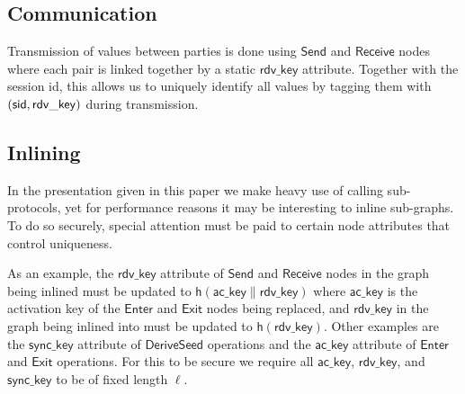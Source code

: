 \subsection{Communication}

Transmission of values between parties is done using $\mathsf{Send}$ and
$\mathsf{Receive}$ nodes where each pair is linked together by a static
$\mathsf{rdv\_key}$ attribute. Together with the session id, this allows us to
uniquely identify all values by tagging them with $(\mathsf{sid}, \mathsf{rdv\_key})$
during transmission.



\subsection{Inlining}

In the presentation given in this paper we make heavy use of calling sub-protocols, yet for performance reasons it may be interesting to inline sub-graphs. To do so securely, special attention must be paid to certain node attributes that control uniqueness.

As an example, the $\mathsf{rdv\_key}$ attribute of $\mathsf{Send}$ and $\mathsf{Receive}$ nodes in the graph being inlined must be updated to $\mathsf{h}(\mathsf{ac\_key} \| \mathsf{rdv\_key})$ where $\mathsf{ac\_key}$ is the activation key of the $\mathsf{Enter}$ and $\mathsf{Exit}$ nodes being replaced, and $\mathsf{rdv\_key}$ in the graph being inlined into must be updated to $\mathsf{h}(\mathsf{rdv\_key})$. Other examples are the $\mathsf{sync\_key}$ attribute of $\mathsf{DeriveSeed}$ operations and the $\mathsf{ac\_key}$ attribute of $\mathsf{Enter}$ and $\mathsf{Exit}$ operations. For this to be secure we require all $\mathsf{ac\_key}$, $\mathsf{rdv\_key}$, and $\mathsf{sync\_key}$ to be of fixed length $\ell$.
